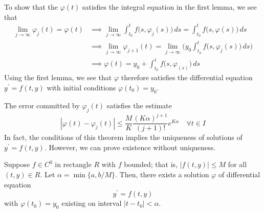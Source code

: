 \documentclass{article}
\newcounter{theorem}[section]
\begin{document}
    To show that the $\varphi(t)$ satisfies the integral equation in the first lemma, we see that
    \begin{align*}
        \lim_{j \rightarrow \infty} \varphi_j (t) = \varphi(t) & \implies \lim_{j \rightarrow \infty} \int_{t_0}^t f\big( s, \varphi_j (s)\big) \, ds = \int_{t_0}^t f\big(s, \varphi(s)\big) \,ds \\
        & \implies \lim_{j \rightarrow \infty} \varphi_{j+1} (t) = \lim_{j \rightarrow \infty} \bigg( y_0 \int_{t_0}^t f \big(s, \varphi_j (s)\big) \,ds\bigg) \\
        & \implies \varphi (t) = y_0 + \int_{t_0}^t f\big(s, \varphi_ (s) \big) \, ds 
    \end{align*}
    Using the first lemma, we see that $\varphi$ therefore satisfies the differential equation $y^\prime = f(t, y)$ with initial conditions $\varphi(t_0) = y_0$. 

    \begin{corollary}
      \label{thm:error-bound-for-successive-approximations}
    The error committed by $\varphi_j (t)$ satisfies the estimate 
    \begin{equation}
      |\varphi (t) - \varphi_j (t)| \leq \frac{M}{K} \frac{(K \alpha)^{j+1}}{(j+1)!} e^{K \alpha} \quad \forall t \in I
    \end{equation}
    In fact, the conditions of this theorem implies the uniqueness of solutions of $y^\prime = f(t, y)$. However, we can prove existence without uniqueness. 
    \end{corollary}

    \begin{theorem}
      \label{thm:peano-existence-theorem}
    Suppose $f \in C^0$ in rectangle $R$ with $f$ bounded; that is, $|f(t, y)| \leq M$ for all $(t, y) \in R$. Let $\alpha = \min\{a, b /M\}$. Then, there exists a solution $\varphi$ of differential equation
    \begin{equation}
      y^\prime = f(t, y)
    \end{equation}
    with $\varphi(t_0) = y_0$ existing on interval $|t - t_0| < \alpha$. 
    \end{theorem}
\end{document}
